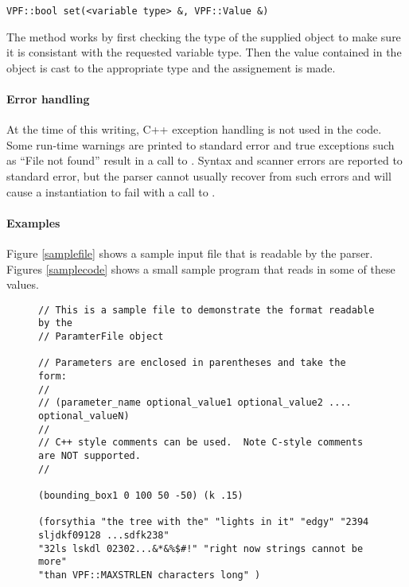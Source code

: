 \begin{appendix}
\begin{verbatim}
VPF::bool set(<variable type> &, VPF::Value &)

\end{verbatim}
The method works by first checking the type of the supplied 
 object to make sure it is consistant with the requested variable
type.  Then the value contained in the  object is cast to the
appropriate type and the assignement is made.

\paragraph{Error handling}
At the time of this writing, C++ exception handling is not used in the
 code.  Some run-time warnings are printed to standard
error and true exceptions such as ``File not found'' result in a call to 
.  Syntax and scanner errors are reported to standard error, but
the parser cannot usually recover from such errors and will cause a
 instantiation to fail with a call to .



\paragraph{Examples}
Figure \ref{samplefile} shows a sample input file that is readable by the
 parser.  Figures \ref{samplecode} shows a small sample
program that reads in some of these values.


\begin{figure}
\footnotesize
\begin{verbatim}
// This is a sample file to demonstrate the format readable by the
// ParamterFile object

// Parameters are enclosed in parentheses and take the form:
//
// (parameter_name optional_value1 optional_value2 .... optional_valueN)
//
// C++ style comments can be used.  Note C-style comments are NOT supported.
//

(bounding_box1 0 100 50 -50) (k .15)

(forsythia "the tree with the" "lights in it" "edgy" "2394 sljdkf09128 ...sdfk238"
"32ls lskdl 02302...&*&%$#!" "right now strings cannot be more"
"than VPF::MAXSTRLEN characters long" )


\end{verbatim}
\end{figure}
\end{appendix}
